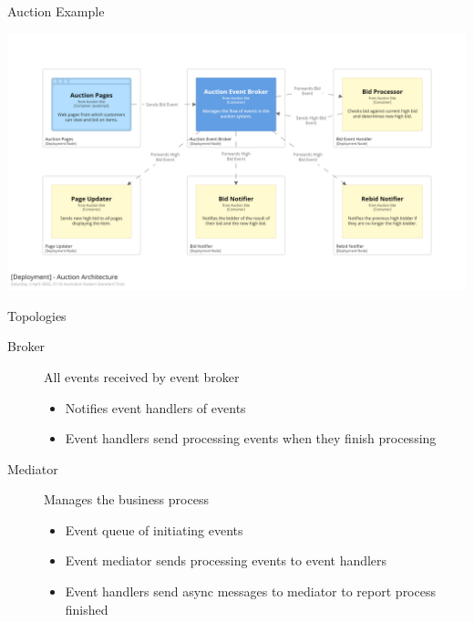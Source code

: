 \documentclass{slide}
\begin{document}
\begin{frame}{Auction Example}
    \begin{adjustwidth}{-10mm}{-10mm}
        \centering
        \includegraphics[trim=195 195 195 195,clip,width=0.97\paperwidth]{../../notes/event/diagrams/auction-architecture.png}
    \end{adjustwidth}
\end{frame}



\begin{frame}{Topologies}
    \vspace{1mm}
    {\LARGE
    \begin{description}
        \item[Broker] All events received by event broker
        \begin{itemize}
            \Large\item Notifies event handlers of events
            \Large\item Event handlers send processing events when they finish processing
	\end{itemize}
        \vspace{3mm}
        \item[Mediator] Manages the business process
        \begin{itemize}
            \Large\item Event queue of initiating events
            \Large\item Event mediator sends processing events to event handlers
            \Large\item Event handlers send async messages to mediator to report process finished
	\end{itemize}
    \end{description}
    }
\end{frame}
\end{document}
